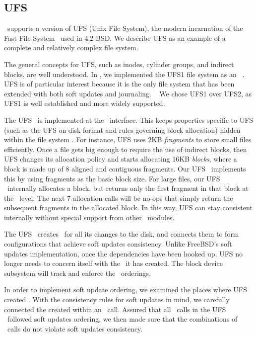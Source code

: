 
\subsection{UFS}
\label{sec:modules:ufs}

\Kudos\ supports a version of UFS (Unix File System), the modern incarnation of
the Fast File System~\cite{mckusick84fast} used in 4.2 BSD. We describe UFS as
an example of a complete and relatively complex file system.

The general concepts for UFS, such as inodes, cylinder groups, and
indirect blocks, are well understood.  In \Kudos, we implemented the UFS1
file system as an \LFS\ \module. UFS is of particular interest because it is
the only file system that has been extended with both soft updates and
journaling. ~\cite{seltzer00journaling} We chose UFS1 over UFS2, as UFS1 is
well established and more widely supported.

The UFS \module\ is implemented at the \LFS\ interface. This keeps properties
specific to UFS (such as the UFS on-disk format and rules governing block
allocation) hidden within the file system \module. For instance, UFS uses
2KB \emph{fragments} to store small files efficiently. Once a file gets big
enough to require the use of indirect blocks, then UFS changes its allocation
policy and starts allocating 16KB \emph{blocks}, where a block is made up of 8
aligned and contiguous fragments. Our UFS \module\ implements this by using
fragments as the basic block size. For large files, our UFS \module\ internally
allocates a block, but returns only the first fragment in that block at the \LFS\
level. The next 7 allocation calls will be no-ops that simply return the
subsequent fragments in the allocated block. In this way, UFS can stay
consistent internally without special support from other \Kudos\ modules.

The UFS \module\ creates \chdescs\ for all its changes to the disk, and
connects them to form configurations that achieve soft updates consistency.
Unlike FreeBSD's soft updates implementation, once the dependencies have been
hooked up, UFS no longer needs to concern itself with the \chdescs\ it has
created. The block device subsystem will track and enforce the
\chdesc\ orderings.

In order to implement soft update ordering, we examined the places where UFS
created \chdescs. With the consistency rules for soft updates in mind, we
carefully connected the \chdescs created within an \LFS\ call. Assured that
all \LFS\ calls in the UFS \module\ followed soft updates ordering, we then made
sure that the combinations of \LFS\ calls do not violate soft updates
consistency.

